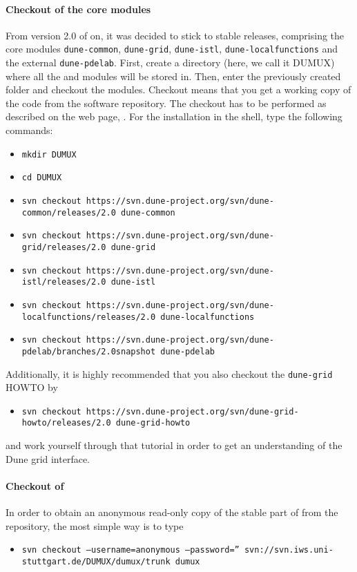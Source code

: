 \paragraph{Checkout of the core modules}
From version 2.0 of \Dune on, it was decided to stick to stable \Dune releases, comprising the core modules 
\texttt{dune-common}, \texttt{dune-grid}, \texttt{dune-istl}, \texttt{dune-localfunctions} and the external \texttt{dune-pdelab}.  
First, create a directory (here, we call it DUMUX) where all the \Dune and \Dumux modules will be stored in. Then, enter the previously created folder and checkout the modules. Checkout means that you get a working copy of the code from the software repository. The checkout has to be performed as described on the \Dune web page, \cite{DUNE-HP}. For the installation in the shell, type the following commands:
\begin{itemize}
\item \texttt{mkdir DUMUX}
\item \texttt{cd DUMUX}
\item \texttt{svn checkout https://svn.dune-project.org/svn/dune-common/releases/2.0 dune-common}
\item \texttt{svn checkout https://svn.dune-project.org/svn/dune-grid/releases/2.0 dune-grid}
\item \texttt{svn checkout https://svn.dune-project.org/svn/dune-istl/releases/2.0 dune-istl}
\item \texttt{svn checkout https://svn.dune-project.org/svn/dune-localfunctions/releases/2.0 dune-localfunctions}
\item \texttt{svn checkout https://svn.dune-project.org/svn/dune-pdelab/branches/2.0snapshot dune-pdelab}
\end{itemize} 

Additionally, it is highly recommended that you also checkout the \texttt{dune-grid} HOWTO by 
\begin{itemize}
\item \texttt{svn checkout https://svn.dune-project.org/svn/dune-grid-howto/releases/2.0 dune-grid-howto}
\end{itemize}
and work yourself through that tutorial in order to get an understanding of the Dune grid interface. 

\paragraph{Checkout of \Dumux}

In order to obtain an anonymous read-only copy of the stable part of \Dumux from the repository, the most simple way is to type
\begin{itemize}
\item \texttt{svn checkout --username=anonymous --password=''
svn://svn.iws.uni-stuttgart.de/DUMUX/dumux/trunk dumux}
\end{itemize}

